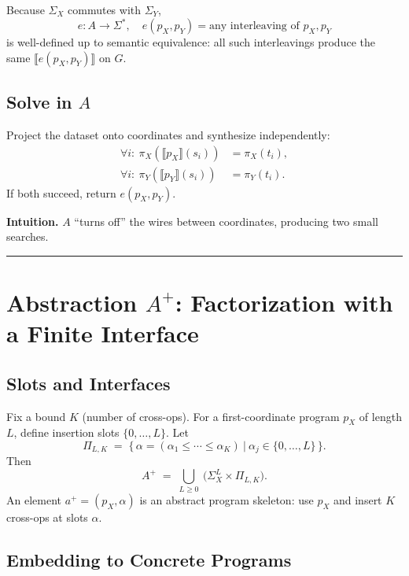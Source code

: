 \documentclass[11pt]{article}
\begin{document}
Because $\Sigma_X$ commutes with $\Sigma_Y$,
\begin{equation}
e:A\to \Sigma^{*},\quad e(p_X,p_Y)=\text{any interleaving of }p_X,p_Y
\end{equation}
is well-defined up to semantic equivalence: all such interleavings produce the same $\llbracket e(p_X,p_Y)\rrbracket$ on $G$.

\subsection{Solve in $A$}

Project the dataset onto coordinates and synthesize independently:
\begin{align}
\forall i:\ \pi_X(\llbracket p_X\rrbracket(s_i))&=\pi_X(t_i),\\
\forall i:\ \pi_Y(\llbracket p_Y\rrbracket(s_i))&=\pi_Y(t_i).
\end{align}
If both succeed, return $e(p_X,p_Y)$.

\textbf{Intuition.} $A$ ``turns off'' the wires between coordinates, producing two small searches.

\vspace{6pt}\noindent\rule{\textwidth}{0.4pt}\vspace{6pt}

\section{Abstraction $A^{+}$: Factorization with a Finite Interface}

\subsection{Slots and Interfaces}

Fix a bound $K$ (number of cross-ops). For a first-coordinate program $p_X$ of length $L$, define insertion slots $\{0,\dots,L\}$. Let
\begin{equation}
\Pi_{L,K} \;=\; \big\{\,\alpha=(\alpha_1\le\cdots\le\alpha_K)\ \big|\ \alpha_j\in\{0,\dots,L\}\,\big\}.
\end{equation}
Then
\begin{equation}
A^{+} \;=\; \bigcup_{L\ge 0}\ \big(\Sigma_X^{L}\times \Pi_{L,K}\big).
\end{equation}
An element $a^{+}=(p_X,\alpha)$ is an abstract program skeleton: use $p_X$ and insert $K$ cross-ops at slots $\alpha$.

\subsection{Embedding to Concrete Programs}
\end{document}
